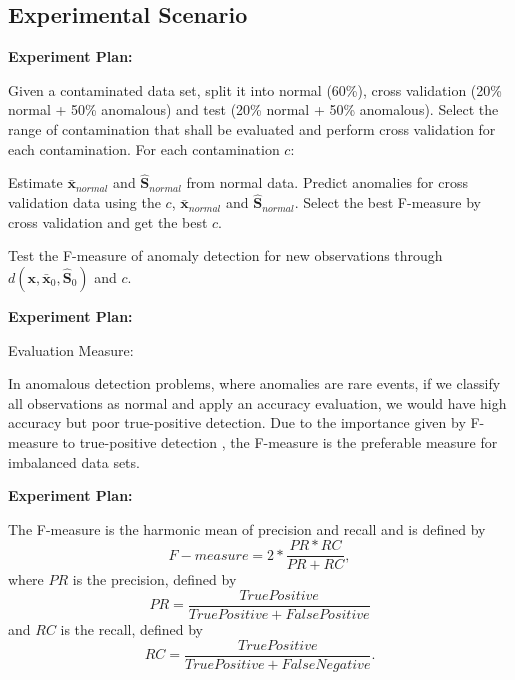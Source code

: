 \documentclass[review]{elsarticle}
\begin{document}
\subsection{Experimental Scenario}
\label{sec:AnalyzedScenario}

\textbf{Experiment Plan:}

	Given a contaminated data set, split it into normal (60\%), cross validation (20\% normal + 50\% anomalous) and test (20\% normal + 50\% anomalous).
	Select the range of contamination that shall be evaluated and perform cross validation for each contamination. 
	For each contamination $c$:
	
		Estimate $\boldsymbol{\bar{x}}_{normal}$ and $\boldsymbol{\hat{S}}_{normal}$ from normal data.
		Predict anomalies for cross validation data using the $c$, $\boldsymbol{\bar{x}}_{normal}$ and $\boldsymbol{\hat{S}}_{normal}$.
		Select the best F-measure by cross validation and get the best $c$.
	
	Test the F-measure of anomaly detection for new observations through $d(\boldsymbol{x},\bar{\boldsymbol{x}}_0, \boldsymbol{\hat{S}}_0)$ and $c$.


\textbf{Experiment Plan:}

    Evaluation Measure:
	
		In anomalous detection problems, where anomalies are rare events, if we classify all observations as normal and apply an accuracy evaluation, we would have high accuracy but poor true-positive detection.
		Due to the importance given by F-measure to true-positive detection \cite{moustafa2019holistic}, the F-measure is the preferable measure for imbalanced data sets.
	


\textbf{Experiment Plan:}

	The F-measure is the harmonic mean of precision and recall and is defined by 
	\begin{equation}\label{eq:eq10}
		F-measure = 2 * \frac{PR * RC}{PR + RC},				
	\end{equation}
	where $PR$ is the precision, defined by 
	\begin{equation}\label{eq:eq11}
		PR = \frac{True Positive}{True Positive + False Positive}
	\end{equation}
	and $RC$ is the recall, defined by 
	\begin{equation}\label{eq:eq12}
		RC = \frac{True Positive}{True Positive + False Negative}.
	\end{equation}
\end{document}
